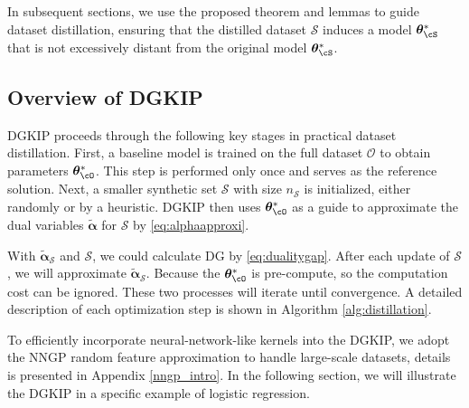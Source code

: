 In subsequent sections, we use the proposed theorem and lemmas to guide dataset distillation, ensuring that the distilled dataset $\mathcal{S}$ induces a model ${\bm \theta_{\cS}^*}$ that is not excessively distant from the original model ${\bm \theta_{\cS}^*}$.

\subsection{Overview of DGKIP}

DGKIP proceeds through the following key stages in practical dataset distillation. First, a baseline model is trained on the full dataset $\mathcal{O}$ to obtain parameters ${\bm \theta_{\cO}^*}$. This step is performed only once and serves as the reference solution. Next, a smaller synthetic set $\mathcal{S}$ with size $n_\mathcal{S}$ is initialized, either randomly or by a heuristic. DGKIP then uses ${\bm \theta_{\cO}^*}$ as a guide to approximate the dual variables $\tilde{\boldsymbol{\alpha}}$ for $\mathcal{S}$ by \eqref{eq:alphaapproxi}. 

With $\tilde{\boldsymbol{\alpha}}_\mathcal{S}$ and $\mathcal{S}$, we could calculate DG by \eqref{eq:dualitygap}. After each update of $\mathcal{S}$, we will approximate $\tilde{\boldsymbol{\alpha}}_\mathcal{S}$. Because the ${\bm \theta_{\cO}^*}$ is pre-compute, so the computation cost can be ignored. These two processes will iterate until convergence. A detailed description of each optimization step is shown in Algorithm \ref{alg:distillation}.

To efficiently incorporate neural-network-like kernels into the DGKIP, we adopt the NNGP random feature approximation \cite{loo2022efficient} to handle large-scale datasets, details is presented in Appendix \ref{nngp_intro}. In the following section, we will illustrate the DGKIP in a specific example of logistic regression. 




